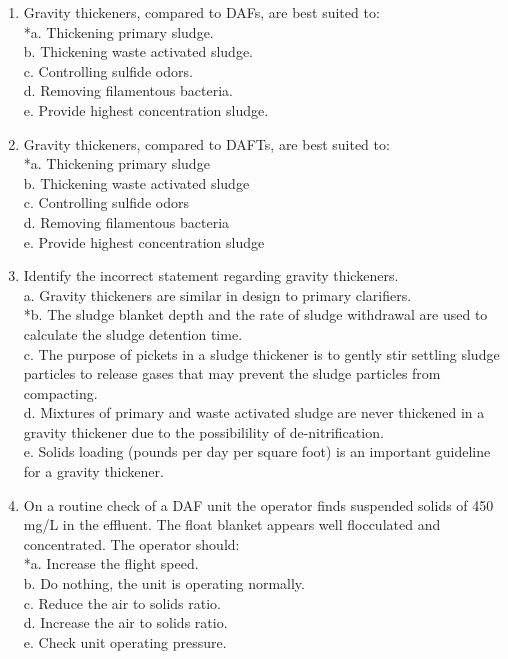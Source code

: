 \documentclass{article}
\begin{document}
\begin{enumerate}
\item  Gravity thickeners, compared to DAFs, are best suited to: \\

*a. Thickening primary sludge. \\
b. Thickening waste activated sludge. \\
c. Controlling sulfide odors. \\
d. Removing filamentous bacteria. \\
e. Provide highest concentration sludge. \\

\item  Gravity thickeners, compared to DAFTs, are best suited to: \\

*a. Thickening primary sludge \\
b. Thickening waste activated sludge \\
c. Controlling sulfide odors \\
d. Removing filamentous bacteria \\
e. Provide highest concentration sludge \\

\item  Identify the incorrect statement regarding gravity thickeners. \\

a. Gravity thickeners are similar in design to primary clarifiers. \\
*b. The sludge blanket depth and the rate of sludge withdrawal are used to calculate the sludge detention time. \\
c. The purpose of pickets in a sludge thickener is to gently stir settling sludge particles to release gases that may prevent the sludge particles from compacting. \\
d. Mixtures of primary and waste activated sludge are never thickened in a gravity thickener due to the possibilility of de-nitrification. \\
e. Solids loading (pounds per day per square foot) is an important guideline for a gravity thickener. \\

\item  On a routine check of a DAF unit the operator finds suspended solids of 450 mg/L in the effluent. The float blanket appears well flocculated and concentrated. The operator should: \\

*a. Increase the flight speed. \\
b. Do nothing, the unit is operating normally. \\
c. Reduce the air to solids ratio. \\
d. Increase the air to solids ratio. \\
e. Check unit operating pressure. \\


\end{enumerate}
\end{document}
